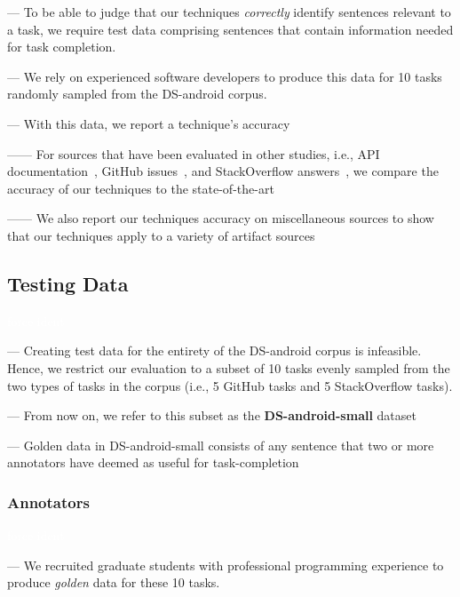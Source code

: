 --- To be able to judge that our techniques \textit{correctly} identify sentences relevant to a task,
we require test data comprising sentences that contain information needed for task completion. \vspace{3mm}

--- We rely on experienced software developers to produce this data for 10 tasks randomly sampled from the \acs{DS-android} corpus. \vspace{3mm}


--- With this data, we report a technique's accuracy

------ For sources that have been evaluated in other studies, i.e., API documentation~\cite{Robillard2015}, GitHub issues~\cite{Lotufo2012}, and StackOverflow answers~\cite{Xu2017}, we compare the accuracy of our techniques 
to the state-of-the-art

------ We also report our techniques accuracy on miscellaneous sources to show that our techniques apply to a variety of artifact sources



\subsection{Testing Data}
\textcolor{white}{force ident} %

--- Creating test data for the entirety of the \acs{DS-android} corpus is infeasible. Hence, we restrict our evaluation to a subset of 10 tasks evenly sampled from the two types of tasks in the corpus (i.e., 5 GitHub tasks and 5 StackOverflow tasks). \vspace{3mm}

--- From now on, we refer to this subset as the \textbf{\acs{DS-android-small}} dataset \vspace{3mm}

--- Golden data in \acs{DS-android-small} consists of any sentence that two or more annotators have deemed as useful for task-completion \vspace{3mm}



\subsubsection{Annotators}
\textcolor{white}{force ident} %

--- We recruited  graduate students with professional programming experience to produce \textit{golden} data for these 10 tasks. \vspace{3mm}


